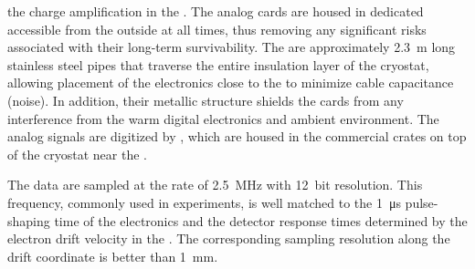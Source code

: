 the charge amplification in the . The analog  cards are housed in dedicated  accessible from the outside at all times, thus removing any significant risks associated with their long-term survivability. The  are approximately \SI{2.3}{m} long stainless steel pipes that traverse the entire insulation layer of the cryostat, allowing placement of the  electronics close to the  to minimize cable capacitance (noise).  In addition, their metallic structure shields the  cards from any interference from the warm digital electronics and ambient environment. The analog signals are digitized by , which are housed in the commercial  crates on top of the cryostat near the . 

The  data are sampled at the rate of \SI{2.5}{MHz} with \SI{12}{bit} resolution. This frequency, %
commonly used in \lartpc experiments, is well matched to the \SI{1}{\micro\second} pulse-shaping time of the  electronics and the detector response times determined by the electron drift velocity in the \lar. The corresponding sampling resolution along the drift coordinate is better than \SI{1}{\mm}. 

